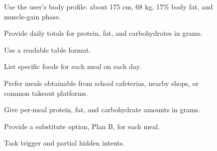 \begin{figure}[h]
{    \vspace{2pt}
    \par
     Use the user's body profile: about 175 cm, 68 kg, 17\% body fat, and muscle-gain phase.
    \par
     Provide daily totals for protein, fat, and carbohydrates in grams.
    \par
     Use a readable table format.
    \par
     List specific foods for each meal on each day.
    \par
     Prefer meals obtainable from school cafeterias, nearby shops, or common takeout platforms.
    \par
     Give per-meal protein, fat, and carbohydrate amounts in grams.
    \par
     Provide a substitute option, Plan B, for each meal.
    }
    \caption{Task trigger and partial hidden intents.}
    \label{fig:case_zhangshunkai_1_deepseek_task}
\end{figure}

